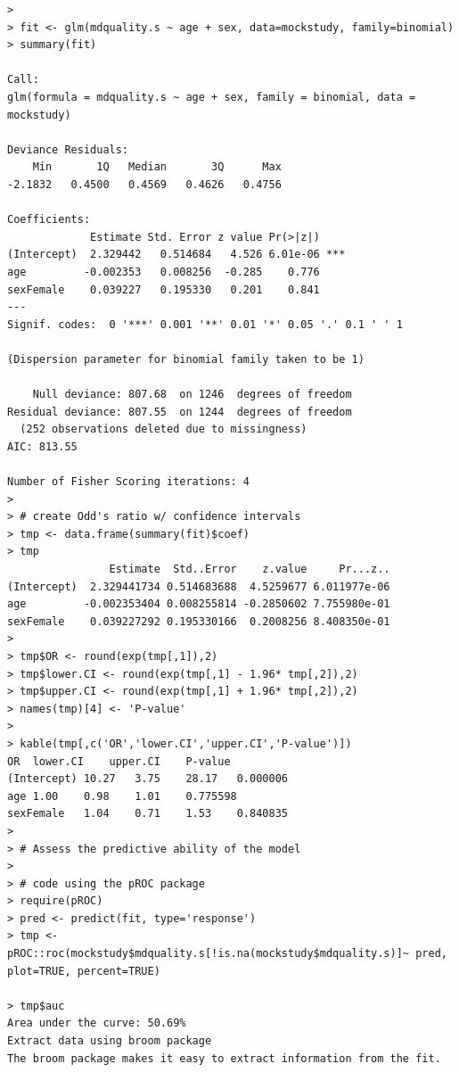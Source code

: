 \documentclass[
]{book}
\begin{document}
\begin{verbatim}
> 
> fit <- glm(mdquality.s ~ age + sex, data=mockstudy, family=binomial)
> summary(fit)

Call:
glm(formula = mdquality.s ~ age + sex, family = binomial, data = mockstudy)

Deviance Residuals: 
    Min       1Q   Median       3Q      Max  
-2.1832   0.4500   0.4569   0.4626   0.4756  

Coefficients:
             Estimate Std. Error z value Pr(>|z|)    
(Intercept)  2.329442   0.514684   4.526 6.01e-06 ***
age         -0.002353   0.008256  -0.285    0.776    
sexFemale    0.039227   0.195330   0.201    0.841    
---
Signif. codes:  0 '***' 0.001 '**' 0.01 '*' 0.05 '.' 0.1 ' ' 1

(Dispersion parameter for binomial family taken to be 1)

    Null deviance: 807.68  on 1246  degrees of freedom
Residual deviance: 807.55  on 1244  degrees of freedom
  (252 observations deleted due to missingness)
AIC: 813.55

Number of Fisher Scoring iterations: 4
> 
> # create Odd's ratio w/ confidence intervals
> tmp <- data.frame(summary(fit)$coef)
> tmp
                Estimate  Std..Error    z.value     Pr...z..
(Intercept)  2.329441734 0.514683688  4.5259677 6.011977e-06
age         -0.002353404 0.008255814 -0.2850602 7.755980e-01
sexFemale    0.039227292 0.195330166  0.2008256 8.408350e-01
> 
> tmp$OR <- round(exp(tmp[,1]),2)
> tmp$lower.CI <- round(exp(tmp[,1] - 1.96* tmp[,2]),2)
> tmp$upper.CI <- round(exp(tmp[,1] + 1.96* tmp[,2]),2)
> names(tmp)[4] <- 'P-value'
> 
> kable(tmp[,c('OR','lower.CI','upper.CI','P-value')])
OR  lower.CI    upper.CI    P-value
(Intercept) 10.27   3.75    28.17   0.000006
age 1.00    0.98    1.01    0.775598
sexFemale   1.04    0.71    1.53    0.840835
> 
> # Assess the predictive ability of the model
> 
> # code using the pROC package
> require(pROC)
> pred <- predict(fit, type='response')
> tmp <- pROC::roc(mockstudy$mdquality.s[!is.na(mockstudy$mdquality.s)]~ pred, plot=TRUE, percent=TRUE)

> tmp$auc
Area under the curve: 50.69%
Extract data using broom package
The broom package makes it easy to extract information from the fit.


\end{verbatim}
\end{document}

